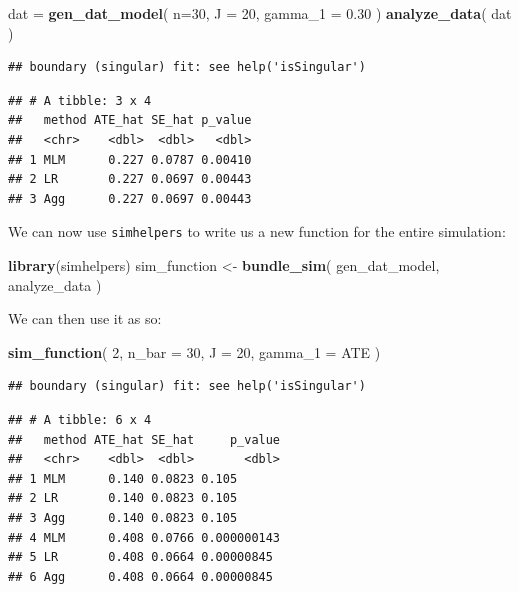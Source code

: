 \documentclass[
]{book}
\newenvironment{Shaded}{\begin{snugshade}}{\end{snugshade}}
\newcommand{\AttributeTok}[1]{\textcolor[rgb]{0.13,0.29,0.53}{#1}}
\newcommand{\DecValTok}[1]{\textcolor[rgb]{0.00,0.00,0.81}{#1}}
\newcommand{\FloatTok}[1]{\textcolor[rgb]{0.00,0.00,0.81}{#1}}
\newcommand{\FunctionTok}[1]{\textcolor[rgb]{0.13,0.29,0.53}{\textbf{#1}}}
\newcommand{\NormalTok}[1]{#1}
\newcommand{\OtherTok}[1]{\textcolor[rgb]{0.56,0.35,0.01}{#1}}
\begin{document}
\begin{Shaded}
\begin{Highlighting}[]
\NormalTok{dat }\OtherTok{=} \FunctionTok{gen\_dat\_model}\NormalTok{( }\AttributeTok{n=}\DecValTok{30}\NormalTok{, }\AttributeTok{J =} \DecValTok{20}\NormalTok{, }\AttributeTok{gamma\_1 =} \FloatTok{0.30}\NormalTok{ )}
\FunctionTok{analyze\_data}\NormalTok{( dat )}
\end{Highlighting}
\end{Shaded}

\begin{verbatim}
## boundary (singular) fit: see help('isSingular')
\end{verbatim}

\begin{verbatim}
## # A tibble: 3 x 4
##   method ATE_hat SE_hat p_value
##   <chr>    <dbl>  <dbl>   <dbl>
## 1 MLM      0.227 0.0787 0.00410
## 2 LR       0.227 0.0697 0.00443
## 3 Agg      0.227 0.0697 0.00443
\end{verbatim}

We can now use \texttt{simhelpers} to write us a new function for the entire simulation:

\begin{Shaded}
\begin{Highlighting}[]
\FunctionTok{library}\NormalTok{(simhelpers)}
\NormalTok{sim\_function }\OtherTok{\textless{}{-}} \FunctionTok{bundle\_sim}\NormalTok{( gen\_dat\_model, analyze\_data )}
\end{Highlighting}
\end{Shaded}

We can then use it as so:

\begin{Shaded}
\begin{Highlighting}[]
\FunctionTok{sim\_function}\NormalTok{( }\DecValTok{2}\NormalTok{, }\AttributeTok{n\_bar =} \DecValTok{30}\NormalTok{, }\AttributeTok{J =} \DecValTok{20}\NormalTok{, }\AttributeTok{gamma\_1 =}\NormalTok{ ATE )}
\end{Highlighting}
\end{Shaded}

\begin{verbatim}
## boundary (singular) fit: see help('isSingular')
\end{verbatim}

\begin{verbatim}
## # A tibble: 6 x 4
##   method ATE_hat SE_hat     p_value
##   <chr>    <dbl>  <dbl>       <dbl>
## 1 MLM      0.140 0.0823 0.105      
## 2 LR       0.140 0.0823 0.105      
## 3 Agg      0.140 0.0823 0.105      
## 4 MLM      0.408 0.0766 0.000000143
## 5 LR       0.408 0.0664 0.00000845 
## 6 Agg      0.408 0.0664 0.00000845
\end{verbatim}
\end{document}

